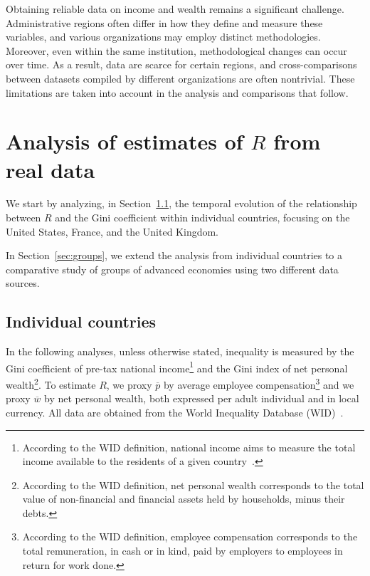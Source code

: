 \documentclass[12pt]{article}
\begin{document}
Obtaining reliable data on income and wealth remains a significant challenge. Administrative regions often differ in how they define and measure these variables, and various organizations may employ distinct methodologies. Moreover, even within the same institution, methodological changes can occur over time. As a result, data are scarce for certain regions, and cross-comparisons between datasets compiled by different organizations are often nontrivial. These limitations are taken into account in the analysis and comparisons that follow. 

\section{Analysis of estimates of $R$ from real data} 
\label{sec:real}

We start by analyzing, in Section~\ref{sec:single}, the temporal evolution of the relationship between $R$ and the Gini coefficient within individual countries, focusing on the United States, France, and the United Kingdom.

In Section~\ref{sec:groups}, we extend the analysis from individual countries to a comparative study of groups of advanced economies using two different data sources.


\subsection{Individual countries}
\label{sec:single}

In the following analyses, unless otherwise stated, inequality is measured by the Gini coefficient of pre-tax national income\footnote{According to the WID definition, national income aims to measure the total income available to the residents of a given country~\cite{WIDglossario}.} and the Gini index of net personal wealth\footnote{According to the WID definition, net personal wealth corresponds to the total value of non-financial and financial assets held by households, minus their debts.}. To estimate $R$, we proxy $\overline{p}$  by average employee compensation\footnote{According to the WID definition, employee compensation corresponds to the total remuneration, in cash or in kind, paid by employers to employees in return for work done.} and we proxy $\overline{w}$  by net personal wealth, both expressed per adult individual and in local currency. All data are obtained from the World Inequality Database (WID)~\cite{WID}.

\end{document}
